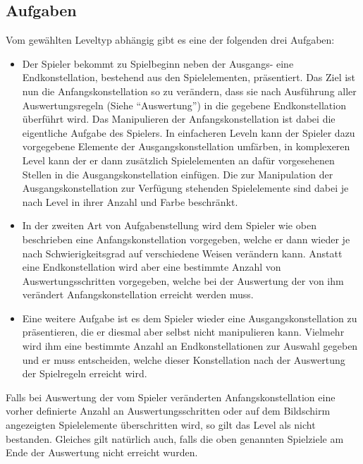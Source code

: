 \subsection{Aufgaben}
Vom gewählten Leveltyp abhängig gibt es eine der folgenden drei Aufgaben:
        \begin{itemize}
                \item Der Spieler bekommt zu Spielbeginn neben der Ausgangs- eine Endkonstellation, bestehend aus den Spielelementen, präsentiert.
                Das Ziel ist nun die Anfangskonstellation so zu verändern, dass sie nach Ausführung aller Auswertungsregeln (Siehe "`Auswertung"') in die gegebene Endkonstellation überführt wird.
                Das Manipulieren der Anfangskonstellation ist dabei die eigentliche Aufgabe des Spielers.
                In einfacheren Leveln kann der Spieler dazu vorgegebene Elemente der Ausgangskonstellation umfärben, in komplexeren Level kann der er dann zusätzlich Spielelementen an dafür vorgesehenen Stellen in die Ausgangskonstellation einfügen. 
                Die zur Manipulation der Ausgangskonstellation zur Verfügung stehenden Spielelemente sind dabei je nach Level in ihrer Anzahl und Farbe beschränkt.

                \item In der zweiten Art von Aufgabenstellung wird dem Spieler wie oben beschrieben eine Anfangskonstellation vorgegeben, welche er dann wieder je nach Schwierigkeitsgrad auf verschiedene Weisen verändern kann.
                Anstatt eine Endkonstellation wird aber eine bestimmte Anzahl von Auswertungsschritten vorgegeben, welche bei der Auswertung der von ihm verändert Anfangskonstellation erreicht werden muss.

                \item Eine weitere Aufgabe ist es dem Spieler wieder eine Ausgangskonstellation zu präsentieren, die er diesmal aber selbst nicht manipulieren kann. 
                Vielmehr wird ihm eine bestimmte Anzahl an Endkonstellationen zur Auswahl gegeben und er muss entscheiden, welche dieser Konstellation nach der Auswertung der Spielregeln erreicht wird.

        \end{itemize}

        Falls bei Auswertung der vom Spieler veränderten Anfangskonstellation eine vorher definierte Anzahl an Auswertungsschritten oder auf dem Bildschirm angezeigten Spielelemente überschritten wird, so gilt das Level als nicht bestanden. 
        Gleiches gilt natürlich auch, falls die oben genannten Spielziele am Ende der Auswertung nicht erreicht wurden.
        
